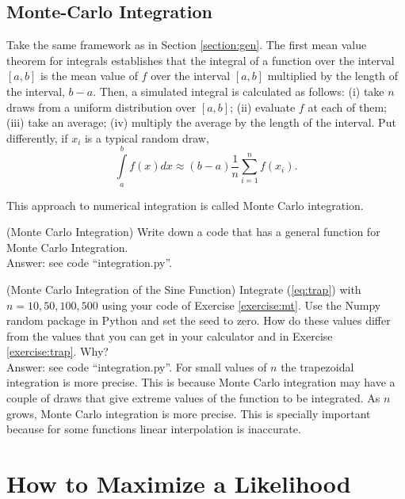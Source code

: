\subsection{Monte-Carlo Integration}
Take the same framework as in Section \ref{section:gen}.  The first mean value theorem for integrals establishes that the integral of a function over the interval $[a,b]$ is the mean value of $f$ over the interval $[a,b]$ multiplied by the length of the interval, $b-a$. Then, a simulated integral is calculated as follows: (i) take $n$ draws from a uniform distribution over $[a,b]$; (ii) evaluate $f$ at each of them; (iii) take an average; (iv) multiply the average by the length of the interval. Put differently, if $x_{i}$ is a typical random draw,
\begin{equation}
\int \limits _{a} ^{b} f(x)dx \approx (b-a) \frac{1}{n} \sum \limits _{i=1} ^{n} f(x_{i}). 
\end{equation}  

\noindent This approach to numerical integration is called Monte Carlo integration.

\begin{exercise} (Monte Carlo Integration) \label{exercise:mt}
Write down a code that has a general function for Monte Carlo Integration.\\
\noindent Answer:  see code ``integration.py''.
\end{exercise}

\begin{exercise} (Monte Carlo Integration of the Sine Function)
Integrate (\ref{eq:trap}) with $n=10,50,100,500$ using your code of Exercise \ref{exercise:mt}. Use the Numpy random package in Python and set the seed to zero. How do these values differ from the values that you can get in your calculator and in Exercise \ref{exercise:trap}. Why?\\
\noindent Answer:  see code ``integration.py''. For small values of $n$ the trapezoidal integration is more precise. This is because Monte Carlo integration may have a couple of draws that give extreme values of the function to be integrated. As $n$ grows, Monte Carlo integration is more precise. This is specially important because for some functions linear interpolation is inaccurate. 
\end{exercise}

\section{How to Maximize a Likelihood}

